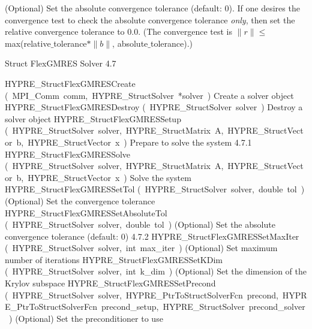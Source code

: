 \documentclass{article}
\begin{document}
\begin{cxxentry}
\begin{cxxentry}
\begin{cxxfunction}
\begin{cxxdoc}
(Optional) Set the absolute convergence tolerance  (default: 0).
If one desires
the convergence test to check the absolute convergence tolerance {\it only}, then
set the relative convergence tolerance to 0.0.  (The convergence test is 
$\|r\| \leq$ max(relative$\_$tolerance$\ast \|b\|$, absolute$\_$tolerance).)
\end{cxxdoc}
\end{cxxfunction}
\end{cxxentry}
\begin{cxxentry}
{}
        {Struct FlexGMRES Solver}
        {}
        {
}
        {4.7}
\begin{cxxnames}
        {HYPRE\_StructFlexGMRESCreate}
        {(\ MPI\_Comm\ comm,\ HYPRE\_StructSolver\ *solver\ )}
        {
Create a solver object}
        {}
\label{cxx.4.7.3}
        {HYPRE\_StructFlexGMRESDestroy}
        {(\ HYPRE\_StructSolver\ solver\ )}
        {
Destroy a solver object}
        {}
\label{cxx.4.7.4}
        {HYPRE\_StructFlexGMRESSetup}
        {(\ HYPRE\_StructSolver\ solver,\ HYPRE\_StructMatrix\ A,\ HYPRE\_StructVector\ b,\ HYPRE\_StructVector\ x\ )}
        {
Prepare to solve the system}
        {4.7.1}
        {HYPRE\_StructFlexGMRESSolve}
        {(\ HYPRE\_StructSolver\ solver,\ HYPRE\_StructMatrix\ A,\ HYPRE\_StructVector\ b,\ HYPRE\_StructVector\ x\ )}
        {
Solve the system}
        {}
\label{cxx.4.7.5}
        {HYPRE\_StructFlexGMRESSetTol}
        {(\ HYPRE\_StructSolver\ solver,\ double\ tol\ )}
        {
(Optional) Set the convergence tolerance}
        {}
\label{cxx.4.7.6}
        {HYPRE\_StructFlexGMRESSetAbsoluteTol}
        {(\ HYPRE\_StructSolver\ solver,\ double\ tol\ )}
        {
(Optional) Set the absolute convergence tolerance (default: 0)}
        {4.7.2}
        {HYPRE\_StructFlexGMRESSetMaxIter}
        {(\ HYPRE\_StructSolver\ solver,\ int\ max\_iter\ )}
        {
(Optional) Set maximum number of iterations}
        {}
\label{cxx.4.7.7}
        {HYPRE\_StructFlexGMRESSetKDim}
        {(\ HYPRE\_StructSolver\ solver,\ int\ k\_dim\ )}
        {
(Optional) Set the dimension of the Krylov subspace}
        {}
\label{cxx.4.7.8}
        {HYPRE\_StructFlexGMRESSetPrecond}
        {(\ HYPRE\_StructSolver\ solver,\ HYPRE\_PtrToStructSolverFcn\ precond,\ HYPRE\_PtrToStructSolverFcn\ precond\_setup,\ HYPRE\_StructSolver\ precond\_solver\ )}
        {
(Optional) Set the preconditioner to use}
        {}
\label{cxx.4.7.9}

\end{cxxnames}
\end{cxxentry}
\end{cxxentry}
\end{document}
